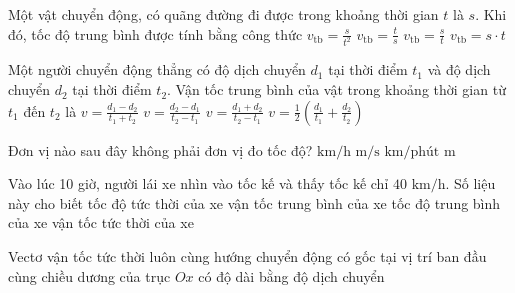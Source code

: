 \begin{ex} Một vật chuyển động, có quãng đường đi được trong khoảng thời gian $t$ là $s$. Khi đó, tốc độ trung bình được tính bằng công thức
\choice
{$v_{\text{tb}} = \frac{s}{t^2}$}
{$v_{\text{tb}} = \frac{t}{s}$}
{\True $v_{\text{tb}} = \frac{s}{t}$}
{$v_{\text{tb}} = s \cdot t$}
\end{ex}

\begin{ex} Một người chuyển động thẳng có độ dịch chuyển $d_1$ tại thời điểm $t_1$ và độ dịch chuyển $d_2$ tại thời điểm $t_2$. Vận tốc trung bình của vật trong khoảng thời gian từ $t_1$ đến $t_2$ là
\choice
{$v = \frac{d_1 - d_2}{t_1 + t_2}$}
{\True $v = \frac{d_2 - d_1}{t_2 - t_1}$}
{$v = \frac{d_1 + d_2}{t_2 - t_1}$}
{$v = \frac{1}{2}\left(\frac{d_1}{t_1} + \frac{d_2}{t_2}\right)$}
\end{ex}

\begin{ex} Đơn vị nào sau đây không phải đơn vị đo tốc độ?
\choice
{$\text{km/h}$}
{$\text{m/s}$}
{$\text{km/phút}$}
{\True $\text{m}$}
\end{ex}

\begin{ex} Vào lúc 10 giờ, người lái xe nhìn vào tốc kế và thấy tốc kế chỉ $40\text{ km/h}$. Số liệu này cho biết
\choice
{\True tốc độ tức thời của xe}
{vận tốc trung bình của xe}
{tốc độ trung bình của xe}
{vận tốc tức thời của xe}
\end{ex}

\begin{ex} Vectơ vận tốc tức thời
\choice
{\True luôn cùng hướng chuyển động}
{có gốc tại vị trí ban đầu}
{cùng chiều dương của trục $Ox$}
{có độ dài bằng độ dịch chuyển}
\end{ex}


